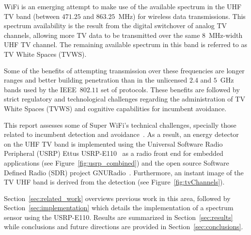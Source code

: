  WiFi is an emerging attempt to make use of the available spectrum in the UHF TV band (between $471.25$ and $863.25$~MHz) for wireless data transmissions. This spectrum availability is the result from the digital switchover of analog TV channels,  allowing more TV data to be transmitted over the same $8$~MHz-width UHF TV channel. The remaining available spectrum in this band is referred to as TV White Spaces (TVWS).

Some of the benefits of attempting transmission over these frequencies are longer ranges and better building penetration than in the unlicensed $2.4$ and $5$~GHz bands used by the IEEE~$802.11$ set of protocols. These benefits are followed by strict regulatory and technological challenges regarding the administration of TV White Spaces (TVWS) and cognitive capabilities for incumbent avoidance.

This report assesses some of Super WiFi's technical challenges, specially those related to incumbent detection and avoidance~\cite{shellhammer2009technical}. As a result, an energy detector on the UHF TV band is implemented using the Universal Software Radio Peripheral (USRP) Ettus USRP-E110~\cite{ettusUSRPE110} as a radio front end for embedded applications (see Figure~\ref{fig:usrp_combined}) and the open source Software Defined Radio (SDR) project GNURadio~\cite{GNURadio}. Furthermore, an instant image of the TV UHF band is derived from the detection (see Figure~\ref{fig:tvChannels}).

Section~\ref{sec:related_work} overviews previous work in this area, followed by Section~\ref{sec:implementation} which details the implementation of a spectrum sensor using the USRP-E110. Results are summarized in Section~\ref{sec:results} while conclusions and future directions are provided in Section~\ref{sec:conclusions}.